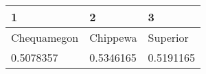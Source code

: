 \begin{table}[ht]
\begin{center}
\begin{tabular}{lll}
  \hline
1 & 2 & 3 \\ 
  \hline
Chequamegon & Chippewa & Superior \\ 
  0.5078357 & 0.5346165 & 0.5191165 \\ 
   \hline
\end{tabular}
\end{center}
\end{table}
